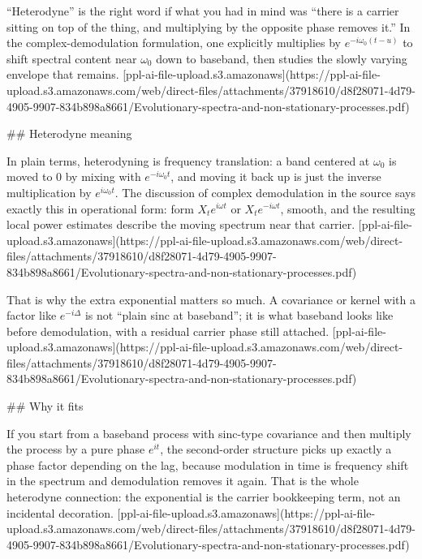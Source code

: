 “Heterodyne” is the right word if what you had in mind was “there is a carrier sitting on top of the thing, and multiplying by the opposite phase removes it.” In the complex-demodulation formulation, one explicitly multiplies by \(e^{-i\omega_0(t-u)}\) to shift spectral content near \(\omega_0\) down to baseband, then studies the slowly varying envelope that remains. [ppl-ai-file-upload.s3.amazonaws](https://ppl-ai-file-upload.s3.amazonaws.com/web/direct-files/attachments/37918610/d8f28071-4d79-4905-9907-834b898a8661/Evolutionary-spectra-and-non-stationary-processes.pdf)

## Heterodyne meaning

In plain terms, heterodyning is frequency translation: a band centered at \(\omega_0\) is moved to \(0\) by mixing with \(e^{-i\omega_0 t}\), and moving it back up is just the inverse multiplication by \(e^{i\omega_0 t}\). The discussion of complex demodulation in the source says exactly this in operational form: form \(X_t e^{i\omega t}\) or \(X_t e^{-i\omega t}\), smooth, and the resulting local power estimates describe the moving spectrum near that carrier. [ppl-ai-file-upload.s3.amazonaws](https://ppl-ai-file-upload.s3.amazonaws.com/web/direct-files/attachments/37918610/d8f28071-4d79-4905-9907-834b898a8661/Evolutionary-spectra-and-non-stationary-processes.pdf)

That is why the extra exponential matters so much. A covariance or kernel with a factor like \(e^{-i\Delta}\) is not “plain sinc at baseband”; it is what baseband looks like before demodulation, with a residual carrier phase still attached. [ppl-ai-file-upload.s3.amazonaws](https://ppl-ai-file-upload.s3.amazonaws.com/web/direct-files/attachments/37918610/d8f28071-4d79-4905-9907-834b898a8661/Evolutionary-spectra-and-non-stationary-processes.pdf)

## Why it fits

If you start from a baseband process with sinc-type covariance and then multiply the process by a pure phase \(e^{it}\), the second-order structure picks up exactly a phase factor depending on the lag, because modulation in time is frequency shift in the spectrum and demodulation removes it again. That is the whole heterodyne connection: the exponential is the carrier bookkeeping term, not an incidental decoration. [ppl-ai-file-upload.s3.amazonaws](https://ppl-ai-file-upload.s3.amazonaws.com/web/direct-files/attachments/37918610/d8f28071-4d79-4905-9907-834b898a8661/Evolutionary-spectra-and-non-stationary-processes.pdf)

